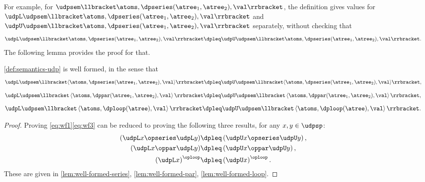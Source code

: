 For example, for $\udpsem\llbracket\atoms,\dpseries(\atree_{1},\atree_{2}),\val\rrbracket$,
the definition gives values for~$\udpL\udpsem\llbracket\atoms,\dpseries(\atree_{1},\atree_{2}),\val\rrbracket$
and~$\udpU\udpsem\llbracket\atoms,\dpseries(\atree_{1},\atree_{2}),\val\rrbracket$
separately, without checking that
\[
    \udpL\udpsem\llbracket\atoms,\dpseries(\atree_{1},\atree_{2}),\val\rrbracket\dpleq\udpU\udpsem\llbracket\atoms,\dpseries(\atree_{1},\atree_{2}),\val\rrbracket.
\]
The following lemma provides the proof for that.
\begin{lemma}
    \label{lem:udpsem-well-formed}\cref{def:semantics-udp} is well
    formed, in the sense that {\small{}
            \begin{equation}
                \udpL\udpsem\llbracket\langle\atoms,\dpseries(\atree_{1},\atree_{2}),\val\rangle\rrbracket\dpleq\udpU\udpsem\llbracket\langle\atoms,\dpseries(\atree_{1},\atree_{2}),\val\rangle\rrbracket,\label{eq:wf1}
            \end{equation}
            \begin{equation}
                \udpL\udpsem\llbracket\left\langle \atoms,\dppar(\atree_{1},\atree_{2}),\val\right\rangle \rrbracket\dpleq\udpU\udpsem\llbracket\left\langle \atoms,\dppar(\atree_{1},\atree_{2}),\val\right\rangle \rrbracket,\label{eq:wf2}
            \end{equation}
            \begin{equation}
                \udpL\udpsem\llbracket\left\langle \atoms,\dploop(\atree),\val\right\rangle \rrbracket\dpleq\udpU\udpsem\llbracket\left\langle \atoms,\dploop(\atree),\val\right\rangle \rrbracket.\label{eq:wf3}
            \end{equation}
        }{\small \par}
\end{lemma}
\begin{proof}
    Proving \cref{eq:wf1}\textemdash \cref{eq:wf3} can be
    reduced to proving the following three results, for any $x,y\in\udpsp$:
    \begin{align*}
        \left(\udpL x\opseries\udpL y\right) & \dpleq\left(\udpU x\opseries\udpU y\right), \\
        \left(\udpL x\oppar\udpL y\right)    & \dpleq\left(\udpU x\oppar\udpU y\right),    \\
        \left(\udpL x\right)^{\oploop}       & \dpleq\left(\udpU x\right)^{\oploop}.
    \end{align*}
    These are given in \cref{lem:well-formed-series}, \cref{lem:well-formed-par},
    \cref{lem:well-formed-loop}.
\end{proof}
